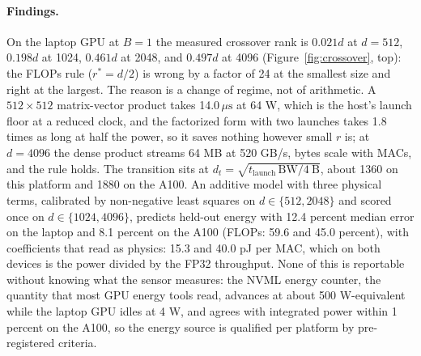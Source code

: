 \documentclass{article}
\newcommand{\rstar}{r^{*}}
\newcommand{\us}{\,\mu\mathrm{s}}
\begin{document}
\paragraph{Findings.} On the laptop GPU at $B = 1$ the measured crossover rank is $0.021d$ at $d = 512$, $0.198d$ at 1024, $0.461d$ at 2048, and $0.497d$ at 4096 (Figure~\ref{fig:crossover}, top): the FLOPs rule ($\rstar = d/2$) is wrong by a factor of 24 at the smallest size and right at the largest. The reason is a change of regime, not of arithmetic. A $512 \times 512$ matrix-vector product takes 14.0$\us$ at 64 W, which is the host's launch floor at a reduced clock, and the factorized form with two launches takes 1.8 times as long at half the power, so it saves nothing however small $r$ is; at $d = 4096$ the dense product streams 64 MB at 520 GB/s, bytes scale with MACs, and the rule holds. The transition sits at $d_t = \sqrt{t_{\mathrm{launch}}\,\mathrm{BW} / 4\ \mathrm{B}}$, about 1360 on this platform and 1880 on the A100. An additive model with three physical terms, calibrated by non-negative least squares on $d \in \{512, 2048\}$ and scored once on $d \in \{1024, 4096\}$, predicts held-out energy with 12.4 percent median error on the laptop and 8.1 percent on the A100 (FLOPs: 59.6 and 45.0 percent), with coefficients that read as physics: 15.3 and 40.0 pJ per MAC, which on both devices is the power divided by the FP32 throughput. None of this is reportable without knowing what the sensor measures: the NVML energy counter, the quantity that most GPU energy tools read, advances at about 500 W-equivalent while the laptop GPU idles at 4 W, and agrees with integrated power within 1 percent on the A100, so the energy source is qualified per platform by pre-registered criteria.
\end{document}
